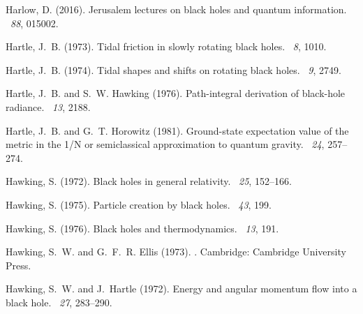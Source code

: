 \documentclass[12pt]{article}
\begin{document}
\begin{thebibliography}{}
Harlow, D. (2016).
\newblock Jerusalem lectures on black holes and quantum information.
~{\em 88}, 015002.

Hartle, J.~B. (1973).
\newblock Tidal friction in slowly rotating black holes.
~{\em 8}, 1010.

Hartle, J.~B. (1974).
\newblock Tidal shapes and shifts on rotating black holes.
~{\em 9}, 2749.

Hartle, J.~B. and S.~W. Hawking (1976).
\newblock Path-integral derivation of black-hole radiance.
~{\em 13}, 2188.

Hartle, J.~B. and G.~T. Horowitz (1981).
\newblock Ground-state expectation value of the metric in the 1/{N} or
  semiclassical approximation to quantum gravity.
~{\em 24}, 257--274.

Hawking, S. (1972).
\newblock Black holes in general relativity.
~{\em 25}, 152--166.

Hawking, S. (1975).
\newblock Particle creation by black holes.
~{\em 43}, 199.

Hawking, S. (1976).
\newblock Black holes and thermodynamics.
~{\em 13}, 191.

Hawking, S.~W. and G.~F.~R. Ellis (1973).
.
\newblock Cambridge: Cambridge University Press.

Hawking, S.~W. and J.~Hartle (1972).
\newblock Energy and angular momentum flow into a black hole.
~{\em 27}, 283--290.


\end{thebibliography}
\end{document}
